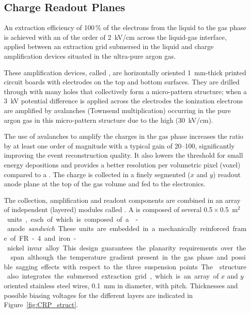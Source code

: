 \subsection{Charge Readout Planes}
\label{v4:fddp-ov:crp}

An extraction efficiency of \num{100}\,\% of the electrons from the liquid to the gas phase is achieved with an \efield of the order of \SI{2}{kV/cm} across the liquid-gas interface, applied between an  extraction grid submersed in the liquid and charge amplification  devices situated in the ultra-pure argon gas. 

These amplification devices, called , are horizontally  oriented \SI{1}{mm}-thick printed  circuit boards with electrodes on the top and bottom surfaces. They are drilled through with many holes that collectively form a micro-pattern structure;  when a \SI{3}{kV} potential difference is applied across the electrodes the ionization electrons are amplified by avalanches (Townsend multiplication) occurring in the  pure argon gas in this micro-pattern structure due to the high \efield (\SI{30}{kV/cm}).

The use of avalanches to amplify the charges in the gas phase increases the  ratio by at least one order of magnitude with a typical gain of \numrange{20}{100}, significantly improving the event reconstruction quality. It also lowers the threshold for small energy depositions and provides a better resolution per volumetric pixel (voxel) compared to a \single \lartpc.  The charge is collected in a finely segmented \twod ($x$ and $y$) readout anode plane at the top of the gas volume and fed to the  electronics.   

The  collection, amplification and readout components are combined in an array of independent (layered) modules called . A  is  composed of several \num{0.5}\,$\times$\,\SI{0.5}{m$^2$} units, each of which is composed  of a -anode \textit{sandwich}.  These units are embedded in a mechanically reinforced frame of FR-4 and iron-nickel invar alloy. This design guarantees the planarity requirements over the  span although the temperature gradient present in the gas phase and possible sagging effects with respect to the three suspension points. The  structure also integrates  the submersed extraction grid, which is an array of $x$ and $y$ oriented stainless steel wires, \SI{0.1}{mm} in diameter, with \dpstrippitch pitch. Thicknesses and possible biasing voltages for the different layers are indicated in Figure~\ref{fig:CRP_struct}.

